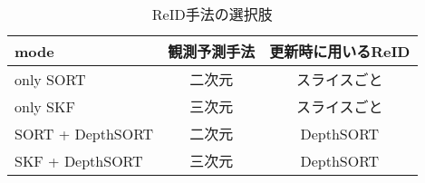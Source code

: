         \begin{table}[t]
            \centering
            \caption[ReID手法の選択肢]{ReID手法の選択肢}
            \label{tab:reidentification_methods}
            \begin{tabular}{l|cc}
                \hline mode &  観測予測手法 & 更新時に用いるReID
                \\\hline \hline only SORT & 二次元 & スライスごと
                \\only SKF & 三次元 & スライスごと
                \\SORT + DepthSORT & 二次元 & DepthSORT
                \\SKF + DepthSORT & 三次元 & DepthSORT
            \end{tabular}
        \end{table}


